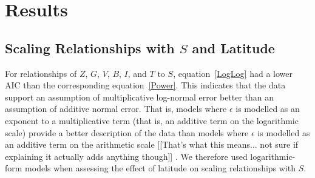 \documentclass[12pt]{article}
\begin{document}




\section*{Results}

\subsection*{Scaling Relationships with $S$ and Latitude}

For relationships of $Z$, $G$, $V$, $B$, $I$, and $T$ to $S$, equation~\ref{LogLog} had a
lower AIC than the corresponding equation~\ref{Power}. This indicates that the
data support an assumption of multiplicative log-normal error better than an
assumption of additive normal error. That is, models where $\epsilon$ is
modelled as an exponent to a multiplicative term (that is, an additive term on
the logarithmic scale) provide a better description of the data than models
where $\epsilon$ is modelled as an additive term on the arithmetic scale
[[That's what this means... not sure if explaining it actually adds anything
though]] .  We therefore used logarithmic-form models when assessing the
effect of latitude on scaling relationships  with $S$.
\end{document}
